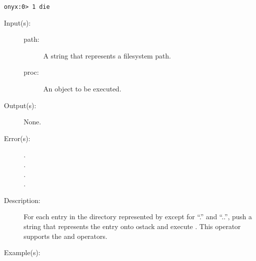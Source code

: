 \begin{description}
\begin{description}
\begin{verbatim}
onyx:0> 1 die
		\end{verbatim}
	\end{description}
\label{systemdict:dirforeach}
\item[{\onyxop{path proc}{dirforeach}{--}}: ]
	\begin{description}\item[]
	\item[Input(s): ]
		\begin{description}\item[]
		\item[path: ]
			A string that represents a filesystem path.
		\item[proc: ]
			An object to be executed.
		\end{description}
	\item[Output(s): ] None.
	\item[Error(s): ]
		\begin{description}\item[]
		\item[.]
		\item[.]
		\item[.]
		\item[.]
		\end{description}
	\item[Description: ]
		For each entry in the directory represented by 
		except for ``.'' and ``..'', push a string that represents the
		entry onto ostack and execute .  This operator
		supports the
		 and
		 operators.
	\item[Example(s): ]\begin{verbatim}


\end{verbatim}
\end{description}
\end{description}
